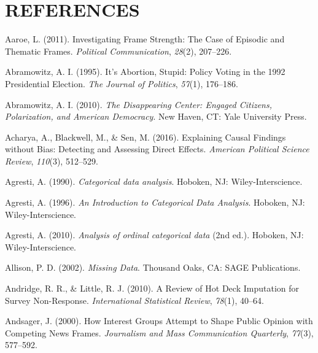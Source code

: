 \documentclass[12pt,econ]{sources/authesis}
\begin{document}
\normalsize

\hypertarget{references}{%
\chapter*{REFERENCES}\label{references}}

\noindent

\ssp

\hypertarget{refs}{}
\leavevmode\hypertarget{ref-aaroe_investigating_2011}{}%
Aaroe, L. (2011). Investigating Frame Strength: The Case of Episodic and Thematic Frames. \emph{Political Communication}, \emph{28}(2), 207--226.

\leavevmode\hypertarget{ref-abramowitz_1995_abortion}{}%
Abramowitz, A. I. (1995). It's Abortion, Stupid: Policy Voting in the 1992 Presidential Election. \emph{The Journal of Politics}, \emph{57}(1), 176--186.

\leavevmode\hypertarget{ref-abramowitz_disappearing_2010}{}%
Abramowitz, A. I. (2010). \emph{The Disappearing Center: Engaged Citizens, Polarization, and American Democracy}. New Haven, CT: Yale University Press.

\leavevmode\hypertarget{ref-acharya_2016_explaining}{}%
Acharya, A., Blackwell, M., \& Sen, M. (2016). Explaining Causal Findings without Bias: Detecting and Assessing Direct Effects. \emph{American Political Science Review}, \emph{110}(3), 512--529.

\leavevmode\hypertarget{ref-agresti_1990_categorical}{}%
Agresti, A. (1990). \emph{Categorical data analysis}. Hoboken, NJ: Wiley-Interscience.

\leavevmode\hypertarget{ref-agresti_1996_introduction}{}%
Agresti, A. (1996). \emph{An Introduction to Categorical Data Analysis}. Hoboken, NJ: Wiley-Interscience.

\leavevmode\hypertarget{ref-agresti_2010_analysis}{}%
Agresti, A. (2010). \emph{Analysis of ordinal categorical data} (2nd ed.). Hoboken, NJ: Wiley-Interscience.

\leavevmode\hypertarget{ref-allison_2002_missing}{}%
Allison, P. D. (2002). \emph{Missing Data}. Thousand Oaks, CA: SAGE Publications.

\leavevmode\hypertarget{ref-andridge_2010_review}{}%
Andridge, R. R., \& Little, R. J. (2010). A Review of Hot Deck Imputation for Survey Non-Response. \emph{International Statistical Review}, \emph{78}(1), 40--64.

\leavevmode\hypertarget{ref-andsager_how_2000}{}%
Andsager, J. (2000). How Interest Groups Attempt to Shape Public Opinion with Competing News Frames. \emph{Journalism and Mass Communication Quarterly}, \emph{77}(3), 577--592.
\end{document}
